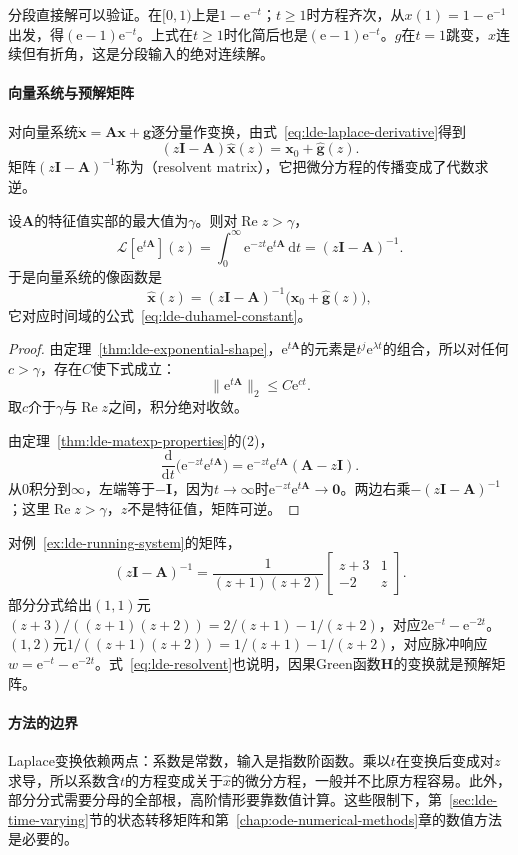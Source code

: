 分段直接解可以验证。在$[0,1)$上是$1-\mathrm{e}^{-t}$；$t\geq1$时方程齐次，从$x(1)=1-\mathrm{e}^{-1}$出发，得$(\mathrm{e}-1)\mathrm{e}^{-t}$。上式在$t\geq1$时化简后也是$(\mathrm{e}-1)\mathrm{e}^{-t}$。$g$在$t=1$跳变，$x$连续但有折角，这是分段输入的绝对连续解。

\paragraph{向量系统与预解矩阵}
对向量系统$\dot{\bm{x}}=\bm{A}\bm{x}+\bm{g}$逐分量作变换，由式~\eqref{eq:lde-laplace-derivative}得到
\[
 (z\bm{I}-\bm{A})\hat{\bm{x}}(z)=\bm{x}_0+\hat{\bm{g}}(z).
\]
矩阵$(z\bm{I}-\bm{A})^{-1}$称为（resolvent matrix），它把微分方程的传播变成了代数求逆。

\begin{theorem}[矩阵指数的变换]
\label{thm:lde-resolvent}
设$\bm{A}$的特征值实部的最大值为$\gamma$。则对$\operatorname{Re}z>\gamma$，
\begin{equation}
 \mathcal{L}[\mathrm{e}^{t\bm{A}}](z)=\int_0^{\infty}\mathrm{e}^{-zt}\mathrm{e}^{t\bm{A}}\,\mathrm{d}t=(z\bm{I}-\bm{A})^{-1}.
 \label{eq:lde-resolvent}
\end{equation}
于是向量系统的像函数是
\begin{equation}
 \hat{\bm{x}}(z)=(z\bm{I}-\bm{A})^{-1}\bigl(\bm{x}_0+\hat{\bm{g}}(z)\bigr),
 \label{eq:lde-vector-transform}
\end{equation}
它对应时间域的公式~\eqref{eq:lde-duhamel-constant}。
\end{theorem}

\begin{proof}
由定理~\ref{thm:lde-exponential-shape}，$\mathrm{e}^{t\bm{A}}$的元素是$t^j\mathrm{e}^{\lambda t}$的组合，所以对任何$c>\gamma$，存在$C$使下式成立：
\[
 \lVert\mathrm{e}^{t\bm{A}}\rVert_2\leq C\mathrm{e}^{ct}.
\]
取$c$介于$\gamma$与$\operatorname{Re}z$之间，积分绝对收敛。

由定理~\ref{thm:lde-matexp-properties}的(2)，
\[
 \frac{\mathrm{d}}{\mathrm{d}t}\bigl(\mathrm{e}^{-zt}\mathrm{e}^{t\bm{A}}\bigr)=\mathrm{e}^{-zt}\mathrm{e}^{t\bm{A}}(\bm{A}-z\bm{I}).
\]
从$0$积分到$\infty$，左端等于$-\bm{I}$，因为$t\to\infty$时$\mathrm{e}^{-zt}\mathrm{e}^{t\bm{A}}\to\bm{0}$。两边右乘$-(z\bm{I}-\bm{A})^{-1}$；这里$\operatorname{Re}z>\gamma$，$z$不是特征值，矩阵可逆。
\end{proof}

对例~\ref{ex:lde-running-system}的矩阵，
\[
 (z\bm{I}-\bm{A})^{-1}=\frac{1}{(z+1)(z+2)}\begin{bmatrix}z+3&1\\-2&z\end{bmatrix}.
\]
部分分式给出$(1,1)$元$(z+3)/((z+1)(z+2))=2/(z+1)-1/(z+2)$，对应$2\mathrm{e}^{-t}-\mathrm{e}^{-2t}$。$(1,2)$元$1/((z+1)(z+2))=1/(z+1)-1/(z+2)$，对应脉冲响应$w=\mathrm{e}^{-t}-\mathrm{e}^{-2t}$。式~\eqref{eq:lde-resolvent}也说明，因果Green函数$\bm{H}$的变换就是预解矩阵。

\paragraph{方法的边界}
Laplace变换依赖两点：系数是常数，输入是指数阶函数。乘以$t$在变换后变成对$z$求导，所以系数含$t$的方程变成关于$\hat{x}$的微分方程，一般并不比原方程容易。此外，部分分式需要分母的全部根，高阶情形要靠数值计算。这些限制下，第~\ref{sec:lde-time-varying}节的状态转移矩阵和第~\ref{chap:ode-numerical-methods}章的数值方法是必要的。
